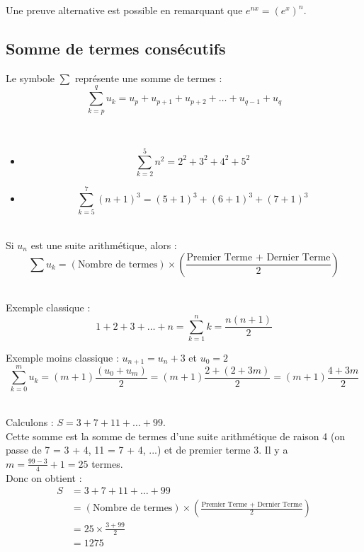 \documentclass[12pt,fleqn]{report} %
\begin{document}
\begin{remark}
	Une preuve alternative est possible en remarquant que $e^{nx} = \left(e^x \right)^n$.
\end{remark}

\subsection{Somme de termes consécutifs}

\begin{remark}
	Le symbole $\sum$ représente une somme de termes : \[
	\sum_{k = p}^{q} u_k = u_p + u_{p+1} + u_{p+2} + \dots + u_{q-1} + u_q
	\]
\end{remark}

\begin{example}\text{ }\\
	\begin{itemize}
		\item[] \[
		\sum_{k = 2}^{5} n^2 = 2^2 + 3^2 + 4^2 + 5^2
		\]
		
		\item[] \[
		\sum_{k = 5}^{7} (n+1)^3 = (5+1)^3 + (6+1)^3 + (7+1)^3 
		\]
	\end{itemize}
\end{example}

\begin{proposition}\text{ }\\
	Si $u_n$ est une suite arithmétique, alors : 
	\[
	\sum u_k = (\text{Nombre de termes}) \times \left(\frac{\text{Premier Terme + Dernier Terme}}{2}\right) 
	\]
\end{proposition}
\begin{example}\text{ }\\
	Exemple classique : 
	\[
	1 + 2 + 3 + \dots + n = \sum_{k = 1}^{n} k = \frac{n(n+1)}{2}
	\]
	
	Exemple moins classique : $u_{n+1} = u_n + 3$ et $u_0 = 2$
	\[
	\sum_{k = 0}^{m} u_k = (m+1)\frac{(u_0 + u_m)}{2} = (m+1)\frac{2 + (2 + 3m)}{2} = (m+1)\frac{4 + 3m}{2}
	\]
\end{example}

\begin{example}\text{ }\\
	Calculons : $S = 3 + 7 + 11 + \dots + 99 $. \\
	Cette somme est la somme de termes d'une suite arithmétique de raison 4 (on passe de 7 = 3 + 4, 11 = 7 + 4, ...) et de premier terme 3. Il y a $ m = \frac{99 -3}{4} + 1 = 25$ termes. \\
	Donc on obtient :  \begin{align*}
	S & = 3 + 7 + 11 + \dots + 99 \\
	& = (\text{Nombre de termes}) \times \left(\frac{\text{Premier Terme + Dernier Terme}}{2}\right) \\
	& = 25 \times \frac{3 + 99}{2} \\
	& = 1275
	\end{align*}
	
\end{example}
\end{document}
